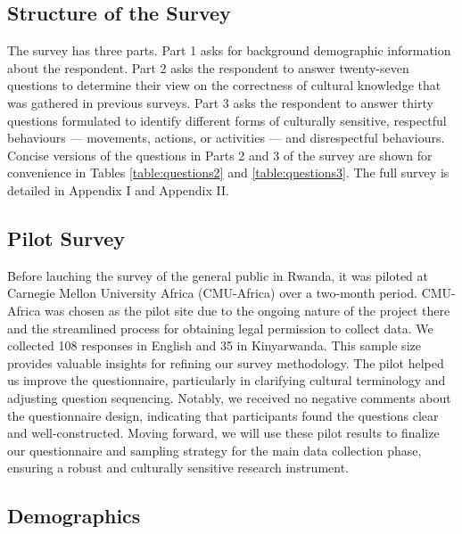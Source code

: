 \documentclass{CSSRforAfrica}
\begin{document}
\clearpage

 


\subsection{Structure of the Survey}
 \label{section:survey}


The survey has three parts. 
Part 1 asks for background demographic information about the respondent. 
Part 2 asks the respondent to answer twenty-seven questions to determine their view on the correctness of  cultural knowledge that was gathered in previous surveys. 
Part 3 asks the respondent to answer thirty questions formulated to identify different forms of culturally sensitive, respectful behaviours --- movements, actions, or activities --- and disrespectful behaviours.
Concise versions of the questions in Parts 2 and 3 of the survey are shown for convenience in Tables \ref{table:questions2}  and   \ref{table:questions3}. The full survey is detailed in Appendix I and Appendix II.


\subsection{Pilot Survey}


Before lauching the survey of the general public in Rwanda, it was piloted at Carnegie Mellon University Africa (CMU-Africa) over a two-month period. CMU-Africa was chosen as the pilot site due to the ongoing nature of the project there and the streamlined process for obtaining legal permission to collect data. We collected 108 responses in English and 35 in Kinyarwanda. This sample size provides valuable insights for refining our survey methodology. The pilot helped us improve the questionnaire, particularly in clarifying cultural terminology and adjusting question sequencing. Notably, we received no negative comments about the questionnaire design, indicating that participants found the questions clear and well-constructed. Moving forward, we will use these pilot results to finalize our questionnaire and sampling strategy for the main data collection phase, ensuring a robust and culturally sensitive research instrument.

\subsection{Demographics}
 \label{section:demographics}
\end{document}
